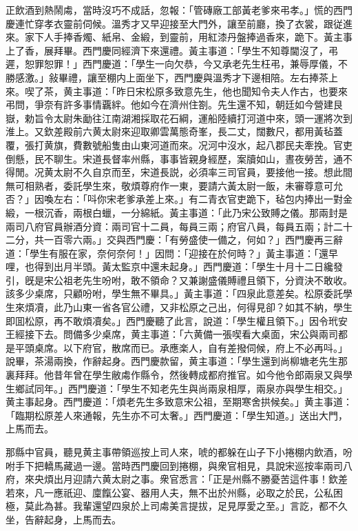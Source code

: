 正飲酒到熱鬧䖏，當時沒巧不成話，忽報：「管磚廠工部黃老爹來弔孝。」慌的西門慶連忙穿孝衣靈前伺候。溫秀才又早迎接至大門外，讓至前廳，換了衣裳，跟従進來。家下人手捧香燭、紙帛、金緞，到靈前，用紅漆丹盤捧過香來，跪下。黃主事上了香，展拜畢。西門慶同經濟下來還禮。黃主事道：「學生不知尊閫沒了，弔遲，恕罪恕罪！」西門慶道：「學生一向欠恭，今又承老先生枉弔，兼辱厚儀，不勝感激。」敍畢禮，讓至棚内上面坐下，西門慶與溫秀才下邊相陪。左右捧茶上來。喫了茶，黄主事道：「昨日宋松原多致意先生，他也聞知令夫人作古，也要來弔問，爭奈有許多事情覊絆。他如今在濟州住劄。先生還不知，朝廷如今營建艮嶽，勅旨令太尉朱勔往江南湖湘採取花石綱，運船陸續打河道中來，頭一運將次到淮上。又欽差殿前六黄太尉來迎取卿雲萬態奇峯，長二丈，闊數尺，都用黃毡蓋覆，張打黄旗，費數號船隻由山東河道而來。况河中沒水，起八郡民夫牽挽。官吏倒懸，民不聊生。宋道長督率州縣，事事皆親身經歷，案牘如山，晝夜勞苦，通不得閒。况黄太尉不久自京而至，宋道長説，必須率三司官員，要接他一接。想此間無可相熟者，委託學生來，敬煩尊府作一東，要請六黃太尉一飯，未審尊意可允否？」因喚左右：「呌你宋老爹承差上來。」有二青衣官吏跪下，毡包内捧出一對金緞，一根沉香，兩根白蠟，一分綿紙。黃主事道：「此乃宋公致賻之儀。那兩封是兩司八府官員辦酒分資：兩司官十二員，每員三兩；府官八員，每員五兩；計二十二分，共一百零六兩。」交與西門慶：「有勞盛使一備之，何如？」西門慶再三辭道：「學生有服在家，奈何奈何！」因問：「迎接在於何時？」黃主事道：「還早哩，也得到出月半頭。黃太監京中還未起身。」西門慶道：「學生十月十二日纔發引，旣是宋公祖老先生吩咐，敢不領命？又兼謝盛儀賻禮且領下，分資決不敢收。該多少桌席，只顧吩咐，學生無不畢具。」黃主事道：「四泉此意差矣。松原委託學生來煩凟，此乃山東一省各官公禮，又非松原之己出，何得見卻？如其不納，學生即囬松原，再不敢煩凟矣。」西門慶聽了此言，說道：「學生權且領下。」因令玳安王經接下去。問備多少桌席，黄主事道：「六黄備一張喫看大桌面，宋公與兩司都是平頭桌席。以下府官，散席而已。承應楽人，自有差撥伺候，府上不必再呌。」說畢，茶湯兩換，作辭起身。西門慶款留，黄主事道：「學生還到尚柳塘老先生那裏拜拜。他昔年曾在學生敝䖏作縣令，然後轉成都府推官。如今他令郎兩泉又與學生鄉試同年。」西門慶道：「學生不知老先生與尚兩泉相厚，兩泉亦與學生相交。」黄主事起身。西門慶道：「煩老先生多致意宋公祖，至期寒舍拱候矣。」黄主事道：「臨期松原差人來通報，先生亦不可太奢。」西門慶道：「學生知道。」送出大門，上馬而去。

那縣中官員，聽見黄主事帶領巡按上司人來，唬的都躲在山子下小捲棚内飲酒，吩咐手下把轎馬藏過一邊。當時西門慶回到捲棚，與衆官相見，具說宋巡按率兩司八府，來央煩出月迎請六黄太尉之事。衆官悉言：「正是州縣不勝憂苦這件事！欽差若來，凡一應祇迎、廩餼公宴、器用人夫，無不出於州縣，必取之於民，公私困極，莫此為甚。我輩還望四泉於上司䖏美言提拔，足見厚愛之至。」言訖，都不久坐，告辭起身，上馬而去。


